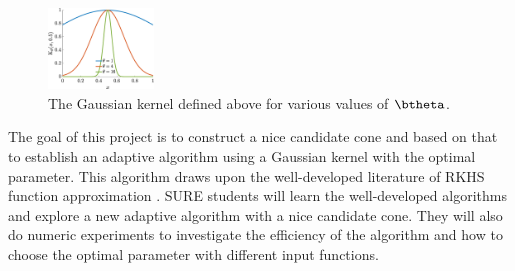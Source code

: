 \begin{figure}
  \begin{center}
    \includegraphics[width=0.25\textwidth]{KthetaPlot.eps} 
  \end{center}
  \caption{The Gaussian kernel defined above for various values of $\btheta$. \label{fig:GaussThPlot}}
\end{figure}
The goal of this project is to construct a nice candidate cone and based on that to establish an adaptive algorithm using a Gaussian kernel with the optimal parameter.
This algorithm draws upon the well-developed literature of RKHS function approximation \cite{Buh03a,Fas07a,FasMcC15a,ForFly15a,ForEtal09,RasWil06a,SchWen06a,Wah85a,Wen05a}. 
SURE students will learn the well-developed algorithms and explore a new adaptive algorithm with a nice candidate cone. 
They will also do numeric experiments to investigate the efficiency of the algorithm and how to choose the optimal parameter with different input functions.
